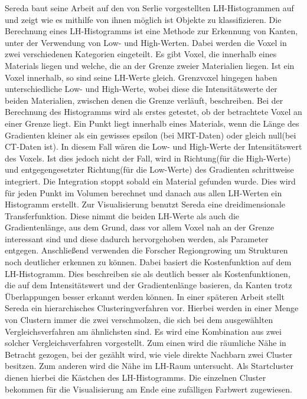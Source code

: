 Sereda baut seine Arbeit \cite{sereda2006visualization} auf den von Serlie \cite{serlie2003computed} vorgestellten LH-Histogrammen auf und zeigt wie es mithilfe von ihnen möglich ist Objekte zu klassifizieren.
\newline
Die Berechnung eines LH-Histogramms ist eine Methode zur Erkennung von Kanten, unter der Verwendung von Low- und High-Werten. Dabei werden die Voxel in zwei verschiedenen Kategorien eingeteilt. Es gibt Voxel, die  innerhalb eines Materials liegen und welche, die  an der Grenze zweier Materialien liegen. Ist ein Voxel innerhalb, so sind seine LH-Werte gleich. Grenzvoxel hingegen haben unterschiedliche Low- und High-Werte, wobei diese die Intensitätswerte der beiden Materialien, zwischen denen die Grenze verläuft, beschreiben. 
\newline
Bei der Berechnung des Histogramms wird als erstes getestet, ob der betrachtete Voxel an einer Grenze liegt. Ein Punkt liegt innerhalb eines Materials, wenn  die Länge des Gradienten kleiner als ein gewisses epsilon (bei MRT-Daten) oder gleich null(bei CT-Daten ist). In diesem Fall wären die Low- und High-Werte der Intensitätswert des Voxels. Ist dies jedoch nicht der Fall, wird in Richtung(für die High-Werte) und entgegengesetzter Richtung(für die Low-Werte) des Gradienten schrittweise integriert. Die Integration stoppt sobald ein Material gefunden wurde. Dies wird für jeden Punkt im Volumen berechnet und danach aus allen LH-Werten ein Histogramm erstellt.
\newline 
Zur Visualisierung benutzt Sereda eine dreidimensionale Transferfunktion. Diese nimmt die beiden LH-Werte als auch die Gradientenlänge, aus dem Grund, dass vor allem Voxel nah an der Grenze interessant sind und diese dadurch hervorgehoben werden, als Parameter entgegen.
\newline
Anschließend verwenden die Forscher Regiongrowing um Strukturen noch deutlicher erkennen zu können. Dabei basiert die Kostenfunktion auf dem LH-Histogramm. Dies beschreiben sie als deutlich besser als Kostenfunktionen, die auf dem Intensitätswert und der Gradientenlänge basieren, da Kanten trotz Überlappungen besser erkannt werden können.
\newline
In einer späteren Arbeit \cite{sereda2006automating} stellt Sereda ein hierarchisches Clusteringverfahren vor. Hierbei werden in einer Menge von Clustern immer die zwei verschmolzen, die sich bei dem ausgewählten Vergleichsverfahren am ähnlichsten sind. Es wird eine Kombination aus zwei solcher Vergleichsverfahren vorgestellt. Zum einen wird die räumliche Nähe in Betracht gezogen, bei der gezählt wird, wie viele direkte Nachbarn zwei Cluster besitzen. Zum anderen wird die Nähe im LH-Raum untersucht. Als Startcluster dienen hierbei die Kästchen des LH-Histogramms. Die einzelnen Cluster bekommen für die Visualisierung am Ende eine zufälligen Farbwert zugewiesen. 


